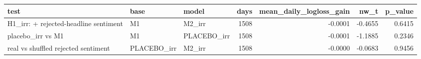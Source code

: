 \begin{tabular}{lllrrrr}
\toprule
test & base & model & days & mean\_daily\_logloss\_gain & nw\_t & p\_value \\
\midrule
H1\_irr: + rejected-headline sentiment & M1 & M2\_irr & 1508 & -0.0001 & -0.4655 & 0.6415 \\
placebo\_irr vs M1 & M1 & PLACEBO\_irr & 1508 & -0.0001 & -1.1885 & 0.2346 \\
real vs shuffled rejected sentiment & PLACEBO\_irr & M2\_irr & 1508 & -0.0000 & -0.0683 & 0.9456 \\
\bottomrule
\end{tabular}
